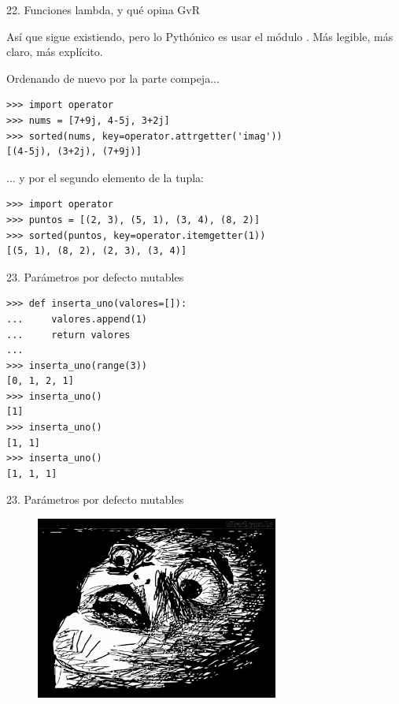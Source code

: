 \documentclass[14pt]{beamer}
\begin{document}
\begin{frame}[fragile]{22. \large Funciones lambda, y qué opina GvR}
  \small
  \begin{block}{}
    \centering
    Así que  sigue existiendo, pero lo Pythónico es
    usar el módulo .  Más legible, más claro, más
    explícito.
  \end{block}

  \footnotesize
  \begin{exampleblock}
    {Ordenando de nuevo por la parte compeja...}
    \begin{lstlisting}
>>> import operator
>>> nums = [7+9j, 4-5j, 3+2j]
>>> sorted(nums, key=operator.attrgetter('imag'))
[(4-5j), (3+2j), (7+9j)]
    \end{lstlisting}
  \end{exampleblock}

  \begin{exampleblock}
    {... y por el segundo elemento de la tupla:}
    \begin{lstlisting}
>>> import operator
>>> puntos = [(2, 3), (5, 1), (3, 4), (8, 2)]
>>> sorted(puntos, key=operator.itemgetter(1))
[(5, 1), (8, 2), (2, 3), (3, 4)]
    \end{lstlisting}
  \end{exampleblock}
\end{frame}

\begin{frame}[fragile]{23. Parámetros por defecto mutables}
  \begin{exampleblock}{}
    \small
    \begin{lstlisting}
>>> def inserta_uno(valores=[]):
...     valores.append(1)
...     return valores
...
>>> inserta_uno(range(3))
[0, 1, 2, 1]
>>> inserta_uno()
[1]
>>> inserta_uno()
[1, 1]
>>> inserta_uno()
[1, 1, 1]
    \end{lstlisting}
  \end{exampleblock}
\end{frame}

\begin{frame}[fragile]{23. Parámetros por defecto mutables}
  \begin{figure}
    \centering
    \includegraphics[height=6cm]{pics/omg-face.jpg}
  \end{figure}
\end{frame}
\end{document}
